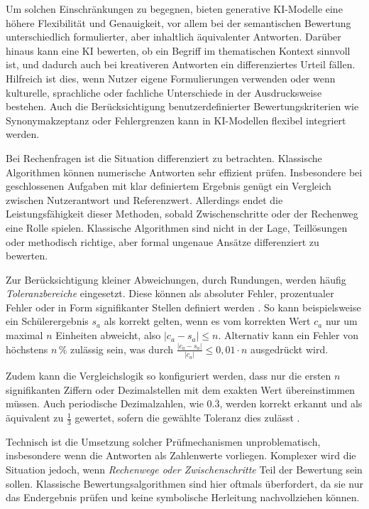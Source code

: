 \documentclass[a4paper,12pt]{article}
\begin{document}
Um solchen Einschränkungen zu begegnen, bieten generative KI-Modelle eine höhere Flexibilität und Genauigkeit, vor allem bei der semantischen Bewertung unterschiedlich formulierter, aber inhaltlich äquivalenter Antworten. Darüber hinaus kann eine KI bewerten, ob ein Begriff im thematischen Kontext sinnvoll ist, und dadurch auch bei kreativeren Antworten ein differenziertes Urteil fällen. Hilfreich ist dies, wenn Nutzer eigene Formulierungen verwenden oder wenn kulturelle, sprachliche oder fachliche Unterschiede in der Ausdrucksweise bestehen. Auch die Berücksichtigung benutzerdefinierter Bewertungskriterien wie Synonymakzeptanz oder Fehlergrenzen kann in KI-Modellen flexibel integriert werden.


Bei Rechenfragen ist die Situation differenziert zu betrachten. Klassische Algorithmen können numerische Antworten sehr effizient prüfen. Insbesondere bei geschlossenen Aufgaben mit klar definiertem Ergebnis genügt ein Vergleich zwischen Nutzerantwort und Referenzwert. Allerdings endet die Leistungsfähigkeit dieser Methoden, sobald Zwischenschritte oder der Rechenweg eine Rolle spielen. Klassische Algorithmen sind nicht in der Lage, Teillösungen oder methodisch richtige, aber formal ungenaue Ansätze differenziert zu bewerten.

Zur Berücksichtigung kleiner Abweichungen, durch Rundungen, werden häufig \textit{Toleranzbereiche} eingesetzt. Diese können als absoluter Fehler, prozentualer Fehler oder in Form signifikanter Stellen definiert werden \parencite{calcme}. So kann beispielsweise ein Schülerergebnis $s_a$ als korrekt gelten, wenn es vom korrekten Wert $c_a$ nur um maximal $n$ Einheiten abweicht, also $|c_a - s_a| \leq n$. Alternativ kann ein Fehler von höchstens $n\,\%$ zulässig sein, was durch $\frac{|c_a - s_a|}{|c_a|} \leq 0{,}01 \cdot n$ ausgedrückt wird.

Zudem kann die Vergleichslogik so konfiguriert werden, dass nur die ersten $n$ signifikanten Ziffern oder Dezimalstellen mit dem exakten Wert übereinstimmen müssen. Auch periodische Dezimalzahlen, wie $0.\overline{3}$, werden korrekt erkannt und als äquivalent zu $\frac{1}{3}$ gewertet, sofern die gewählte Toleranz dies zulässt \parencite{calcme}.

Technisch ist die Umsetzung solcher Prüfmechanismen unproblematisch, insbesondere wenn die Antworten als Zahlenwerte vorliegen. Komplexer wird die Situation jedoch, wenn \textit{Rechenwege oder Zwischenschritte} Teil der Bewertung sein sollen. Klassische Bewertungsalgorithmen sind hier oftmals überfordert, da sie nur das Endergebnis prüfen und keine symbolische Herleitung nachvollziehen können.
\end{document}
